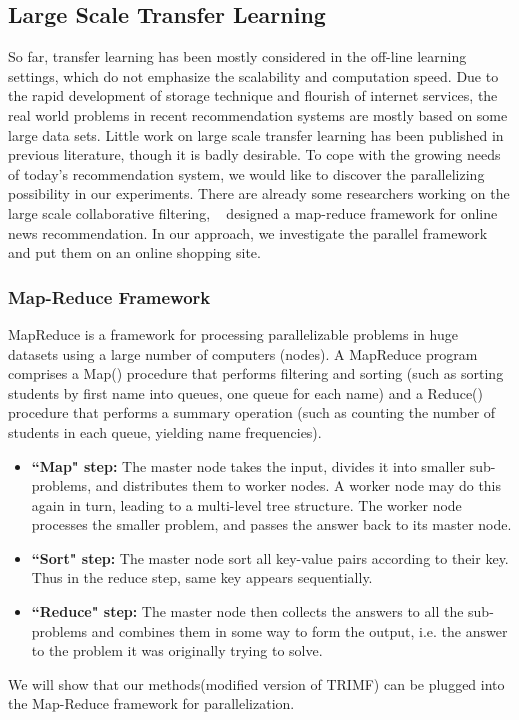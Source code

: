 \subsection{Large Scale Transfer Learning}
So far, transfer learning has been mostly considered in the off-line learning settings, which do not emphasize the scalability and computation speed. Due to the rapid development of storage technique and flourish of internet services, the real world problems in recent recommendation systems are mostly based on some large data sets. Little work on large scale transfer learning has been published in previous literature, though it is badly desirable. To cope with the growing needs of today's recommendation system, we would like to discover the parallelizing possibility in our experiments. There are already some researchers working on the large scale collaborative filtering, ~\cite{das2007google} designed a map-reduce framework for online news recommendation. In our approach, we investigate the parallel framework and put them on an online shopping site.

\hspace{0.02in}
\subsubsection{Map-Reduce Framework}
MapReduce is a framework for processing parallelizable problems in huge datasets using a large number of computers (nodes). A MapReduce program comprises a Map() procedure that performs filtering and sorting (such as sorting students by first name into queues, one queue for each name) and a Reduce() procedure that performs a summary operation (such as counting the number of students in each queue, yielding name frequencies).
\begin{itemize}
\item {\bf ``Map" step:} The master node takes the input, divides it into smaller sub-problems, and distributes them to worker nodes. A worker node may do this again in turn, leading to a multi-level tree structure. The worker node processes the smaller problem, and passes the answer back to its master node.
\item {\bf ``Sort" step:} The master node sort all key-value pairs according to their key. Thus in the reduce step, same key appears sequentially.
\item {\bf ``Reduce" step:} The master node then collects the answers to all the sub-problems and combines them in some way to form the output, i.e. the answer to the problem it was originally trying to solve.
\end{itemize}
We will show that our methods(modified version of TRIMF) can be plugged into the Map-Reduce framework for parallelization.




